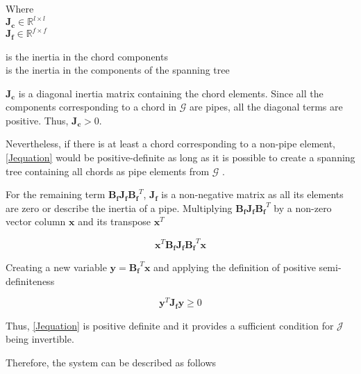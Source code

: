 \begin{minipage}[t]{0.20\textwidth}
Where\\
\hspace*{8mm} $\pmb{J_c} \in \mathbb{R}^{l \times l}$  \\
\hspace*{8mm} $\pmb{J_f} \in \mathbb{R}^{f \times f} $ 
\end{minipage}
\begin{minipage}[t]{0.68\textwidth}
\vspace*{2mm}
\hspace*{4mm} is the inertia in the chord components\\
\hspace*{4mm} is the inertia in the components of the spanning tree 
\end{minipage}

$\pmb{J_c}$ is a diagonal inertia matrix containing the chord elements. Since all the components corresponding to a chord in $\pmb{\mathcal{G}}$ are pipes, all the 
diagonal terms are positive. Thus, $\pmb{J_c} > 0$. 

Nevertheless, if there is at least a chord corresponding to a non-pipe element, \eqref{Jequation} 
would be positive-definite as long as it is possible to create a spanning tree containing all chords as pipe elements from $\pmb{\mathcal{G}}$ \cite{TowerModel}.

For the remaining term $\pmb{B_f J_f {B_f}}^T$, $\pmb{J_f}$ is a non-negative matrix as all its elements are zero or describe the inertia of a pipe. 
Multiplying $\pmb{B_f J_f {B_f}}^T$ by a non-zero vector column $\mathbf{x}$ and its transpose $\mathbf{x}^{T}$

\begin{equation}
  \pmb{x}^{T} \pmb{B_f J_f {B_f}}^T \pmb{x}
  \label{PosDefi}
\end{equation}

Creating a new variable $\pmb{y} = \pmb{B_f}^T \mathbf{x}$ and applying the definition of positive semi-definiteness 
\cite{MatrixBook}

\begin{equation}
  \pmb{y}^{T} \pmb{J_f y} \geqslant 0
  \label{PosDefEq}
\end{equation}

Thus, \eqref{Jequation} is positive definite and it provides a sufficient condition for $\pmb{\mathcal{J}}$ being invertible. 

Therefore, the system can be described as follows

